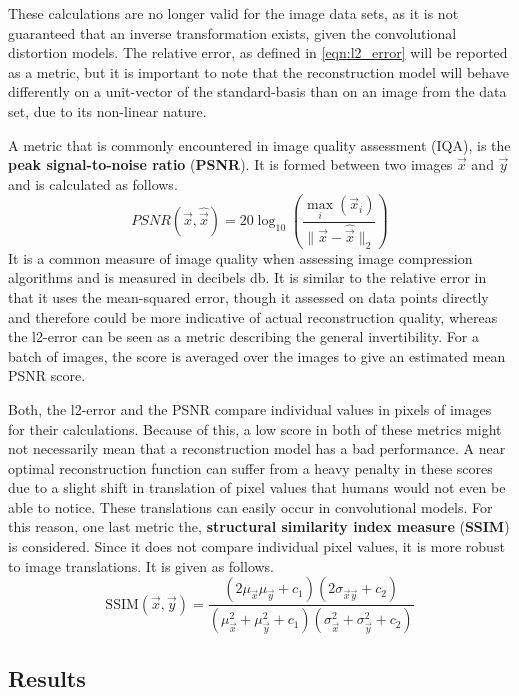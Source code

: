 These calculations are no longer valid for the image data sets, as it is not guaranteed that 
an inverse transformation exists, given the convolutional distortion models. The relative
error, as defined in \ref{eqn:l2_error} will be reported as a metric, but it is important to
note that the reconstruction model will behave differently on a unit-vector of the standard-basis
than on an image from the data set, due to its non-linear nature.

A metric that is commonly encountered in image quality assessment (IQA), is the 
\textbf{peak signal-to-noise ratio} (\textbf{PSNR}).
It is formed between two images $\vec x$ and $\vec y$ and is calculated as follows.
\[
    PSNR(\vec x, \hat {\vec x}) = 20 \log_{10} \left (\frac {\max_i(\vec x_i)} {\|\vec x-\hat {\vec x}\|_2} \right )
\]
It is a common measure of image quality when assessing image compression algorithms and is measured in decibels db.
It is similar to the relative error in that it uses the mean-squared error, 
though it assessed on data points directly and therefore could be more indicative of actual 
reconstruction quality, whereas the l2-error can be seen as a metric describing the general invertibility.
For a batch of images, the score is averaged over the images to give an estimated mean PSNR score.

Both, the l2-error and the PSNR compare individual values in pixels of images for their calculations.
Because of this, a low score in both of these metrics might not necessarily mean that a reconstruction
model has a bad performance. A near optimal reconstruction function can suffer from a heavy penalty
in these scores due to a slight shift in translation of pixel values that humans would not even be
able to notice.
These translations can easily occur in convolutional models.
For this reason, one last metric the, \textbf{structural similarity index measure} (\textbf{SSIM})
is considered. Since it does not compare individual pixel values, it is more robust to 
image translations.
It is given as follows.
\[
    \text{SSIM}(\vec x, \vec y) 
    = \frac {(2 \mu_{\vec x} \mu_{\vec y} + c_1)(2\sigma_{\vec x\vec y} + c_2)}
    {(\mu_{\vec x}^2 + \mu_{\vec y}^2 + c_1)(\sigma_{\vec x}^2 + \sigma_{\vec y}^2 + c_2)}
\]


\subsection{Results}
